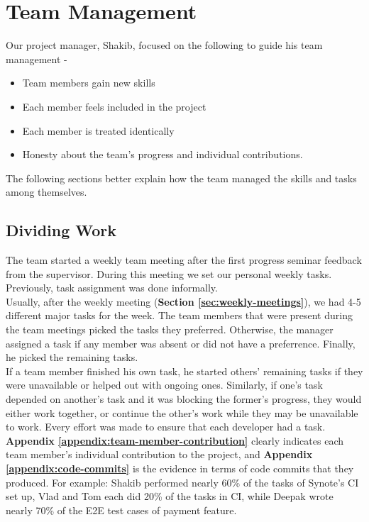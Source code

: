 \section{Team Management}
\label{sec:people-management}
Our project manager, Shakib, focused on the following to guide his team management \cite{iansommerville2011}-

\begin{itemize}

  \item Team members gain new skills
  \item Each member feels included in the project
  \item Each member is treated identically
  \item Honesty about the team's progress and individual contributions.

\end{itemize}

The following sections better explain how the team managed the skills and tasks among themselves.

\subsection{Dividing Work}
\label{subsec:dividing-work}
The team started a weekly team meeting after the first progress seminar feedback from the supervisor. During this meeting we set our personal weekly tasks. Previously, task assignment was done informally.\\

Usually, after the weekly meeting (\textbf{Section \ref{sec:weekly-meetings}}), we had 4-5 different major tasks for the week. The team members that were present during the team meetings picked the tasks they preferred. Otherwise, the manager assigned a task if any member was absent or did not have a preferrence. Finally, he picked the remaining tasks.\\

If a team member finished his own task, he started others' remaining tasks if they were unavailable or helped out with ongoing ones. Similarly, if one's task depended on another's task and it was blocking the former's progress, they would either work together, or continue the other's work while they may be unavailable to work. Every effort was made to ensure that each developer had a task.\\

\textbf{Appendix \ref{appendix:team-member-contribution}} clearly indicates each team member's individual contribution to the project, and \textbf{Appendix \ref{appendix:code-commits}} is the evidence in terms of code commits that they  produced. For example: Shakib performed nearly 60\% of the tasks of Synote's CI set up, Vlad and Tom each did 20\% of the tasks in CI, while Deepak wrote nearly 70\% of the E2E test cases of payment feature.\\

